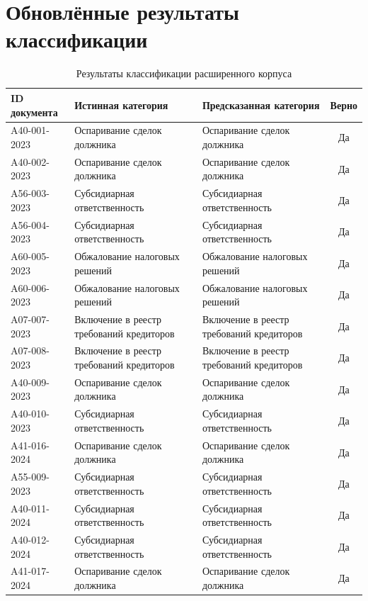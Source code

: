 \documentclass[12pt, a4paper]{report}
\newcommand{\placeholder}[2][Вставьте результат]{%
  \begin{tcolorbox}[placeholderbox, title={#2}]
    #1
  \end{tcolorbox}%
  \vspace{4pt}%
}
\begin{document}
\section{Обновлённые результаты классификации}


\begin{table}[H]
  \centering
  \caption{Результаты классификации расширенного корпуса}
  \label{tab:classification}
  \begin{tabularx}{\textwidth}{l X X c}
    \toprule
    \rowcolor{LightBlue}
    \textsf{\textbf{ID документа}} &
    \textsf{\textbf{Истинная категория}} &
    \textsf{\textbf{Предсказанная категория}} &
    \textsf{\textbf{Верно}} \\
    \midrule
    A40-001-2023 & Оспаривание сделок должника & Оспаривание сделок должника & Да \\
    A40-002-2023 & Оспаривание сделок должника & Оспаривание сделок должника & Да \\
    A56-003-2023 & Субсидиарная ответственность & Субсидиарная ответственность & Да \\
    A56-004-2023 & Субсидиарная ответственность & Субсидиарная ответственность & Да \\
    A60-005-2023 & Обжалование налоговых решений & Обжалование налоговых решений & Да \\
    A60-006-2023 & Обжалование налоговых решений & Обжалование налоговых решений & Да \\
    A07-007-2023 & Включение в реестр требований кредиторов & Включение в реестр требований кредиторов & Да \\
    A07-008-2023 & Включение в реестр требований кредиторов & Включение в реестр требований кредиторов & Да \\
    A40-009-2023 & Оспаривание сделок должника & Оспаривание сделок должника & Да \\
    A40-010-2023 & Субсидиарная ответственность & Субсидиарная ответственность & Да \\
    A41-016-2024 & Оспаривание сделок должника & Оспаривание сделок должника & Да \\
    A55-009-2023 & Субсидиарная ответственность & Субсидиарная ответственность & Да \\
    A40-011-2024 & Субсидиарная ответственность & Субсидиарная ответственность & Да \\
    A40-012-2024 & Субсидиарная ответственность & Субсидиарная ответственность & Да \\
    A41-017-2024 & Оспаривание сделок должника & Оспаривание сделок должника & Да \\
    \midrule
  \end{tabularx}
\end{table}
\end{document}
